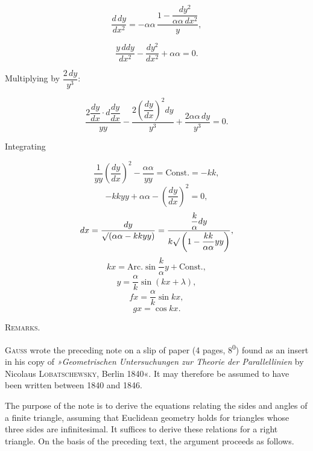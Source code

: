 %
\[
\frac{d\,dy}{dx^{2}} = -\alpha\alpha\,\frac{1-\dfrac{dy^{2}}{\alpha\alpha\,dx^{2}}}{y},
\]

\[
\frac{y\,ddy}{dx^{2}} - \frac{dy^{2}}{dx^{2}} + \alpha\alpha = 0.
\]

\noindent Multiplying by $\dfrac{2\,dy}{y^{3}}$:

\[
\frac{2\dfrac{dy}{dx}\cdot d\dfrac{dy}{dx}}{yy} - \frac{2\left(\dfrac{dy}{dx}\right)^{2}dy}{y^{3}} + \frac{2\alpha\alpha\,dy}{y^{3}} = 0.
\]

\noindent Integrating

\[
\frac{1}{yy}\left(\frac{dy}{dx}\right)^{2} - \frac{\alpha\alpha}{yy} = \text{Const.} = -kk,
\]
\[
-kkyy + \alpha\alpha - \left(\frac{dy}{dx}\right)^{2} = 0,
\]
\[
dx = \frac{dy}{\mathord{\surd}(\alpha\alpha-kkyy)} = \frac{\dfrac{k}{\alpha}dy}{k\mathord{\surd}\left(1-\dfrac{kk}{\alpha\alpha}yy\right)},
\]
\[
kx = \text{Arc.}\sin\frac{k}{\alpha}y + \text{Const.},
\]
\[
y = \frac{\alpha}{k}\sin(kx+\lambda),
\]
\[
fx = \frac{\alpha}{k}\sin kx,
\]
\[
gx = \cos kx.
\]

\smallskip
\begin{center}

\end{center}

\begin{center}
\textsc{Remarks.}
\end{center}

\noindent \textsc{Gauss} wrote the preceding note on a slip of paper (4 pages, 8\textsuperscript{0}) found as an insert in his copy of \emph{»Geometrischen Untersuchungen zur Theorie der Parallellinien} by Nicolaus \textsc{Lobatschewsky}, Berlin 1840«. It may therefore be assumed to have been written between 1840 and 1846.

The purpose of the note is to derive the equations relating the sides and angles of a finite triangle, assuming that Euclidean geometry holds for triangles whose three sides are infinitesimal. It suffices to derive these relations for a right triangle. On the basis of the preceding text, the argument proceeds as follows.

